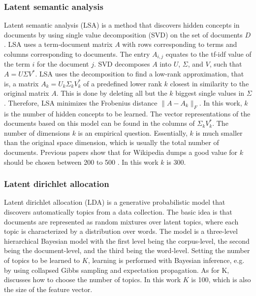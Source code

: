 \documentclass[a4paper]{article}
\begin{document}
\subsubsection{Latent semantic analysis}
Latent semantic analysis (LSA) \cite{deerwester1990indexing} is a method that discovers hidden concepts in documents by using single value decomposition (SVD) on the set of documents $D$.
LSA uses a term-document matrix $A$ with rows corresponding to terms and columns corresponding to documents. The entry $A_{i,j}$ equates to the tf-idf value of the term $i$ for the document $j$. SVD decomposes $A$ into $U$, $\Sigma$, and $V$, such that $A = U \Sigma V^*$.
LSA uses the decomposition to find a low-rank approximation, that is, a matrix $A_k = U_k \Sigma_k V_k^*$ of a predefined lower rank $k$ closest in similarity to the original matrix $A$. This is done by deleting all but the $k$ biggest single values in $\Sigma$.
Therefore, LSA minimizes the Frobenius distance $\|A-A_k\|_F$. In this work, $k$ is the number of hidden concepts to be learned. The vector representations of the documents based on this model can be found in the columns of $\Sigma_k V_k^*$.
The number of dimensions $k$ is an empirical question. Essentially, $k$ is much smaller than the original space dimension, which is usually the total number of documents. Previous papers show that for Wikipedia dumps a good value for $k$ should be chosen between 200 to 500 \cite{bradford2008empirical}. In this work $k$ is 300.


\subsubsection{Latent dirichlet allocation}
Latent dirichlet allocation (LDA) \cite{blei2003latent} is a generative probabilistic model that discovers automatically topics from a data collection.
The basic idea is that documents are represented as random mixtures over latent topics, where each topic is characterized by a distribution over words. The model is a three-level hierarchical Bayesian model with the first level being the corpus-level, the second being the document-level, and the third being the word-level. Setting the number of topics to be learned to $K$, learning is performed with Bayesian inference, e.g. by using collapsed Gibbs sampling and expectation propagation. As for K, \cite{hoffman2010online} discusses how to choose the number of topics. In this work $K$ is 100, which is also the size of the feature vector.
\end{document}
